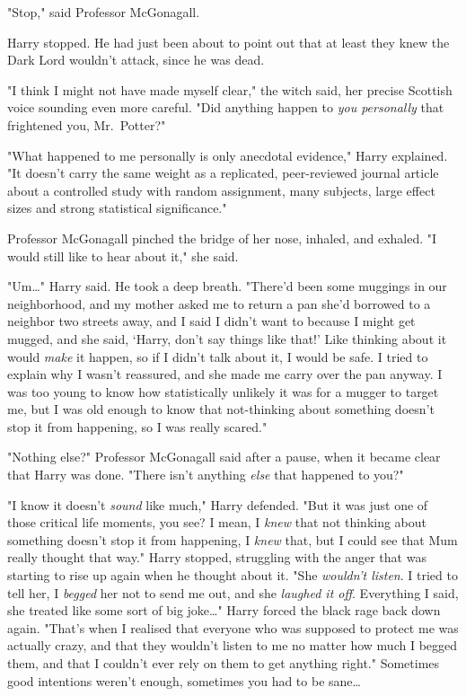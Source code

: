 "Stop," said Professor McGonagall.

Harry stopped. He had just been about to point out that at least they knew the 
Dark Lord wouldn't attack, since he was dead.

"I think I might not have made myself clear," the witch said, her precise 
Scottish voice sounding even more careful. "Did anything happen to \emph{you 
personally} that frightened you, Mr.~Potter?"

"What happened to me personally is only anecdotal evidence," Harry explained. 
"It doesn't carry the same weight as a replicated, peer-reviewed journal 
article about a controlled study with random assignment, many subjects, large 
effect sizes and strong statistical significance."

Professor McGonagall pinched the bridge of her nose, inhaled, and exhaled. "I 
would still like to hear about it," she said.

"Um{\ldots}" Harry said. He took a deep breath. "There'd been some muggings in 
our neighborhood, and my mother asked me to return a pan she'd borrowed to a 
neighbor two streets away, and I said I didn't want to because I might get 
mugged, and she said, `Harry, don't say things like that!' Like thinking about 
it would \emph{make} it happen, so if I didn't talk about it, I would be safe. 
I tried to explain why I wasn't reassured, and she made me carry over the pan 
anyway. I was too young to know how statistically unlikely it was for a mugger 
to target me, but I was old enough to know that not-thinking about something 
doesn't stop it from happening, so I was really scared."

"Nothing else?" Professor McGonagall said after a pause, when it became clear 
that Harry was done. "There isn't anything \emph{else} that happened to you?"

"I know it doesn't \emph{sound} like much," Harry defended. "But it was just 
one of those critical life moments, you see? I mean, I \emph{knew} that not 
thinking about something doesn't stop it from happening, I \emph{knew} that, 
but I could see that Mum really thought that way." Harry stopped, struggling 
with the anger that was starting to rise up again when he thought about it. 
"She \emph{wouldn't listen}. I tried to tell her, I \emph{begged} her not to 
send me out, and she \emph{laughed it off}. Everything I said, she treated like 
some sort of big joke{\ldots}" Harry forced the black rage back down again. 
"That's when I realised that everyone who was supposed to protect me was 
actually crazy, and that they wouldn't listen to me no matter how much I begged 
them, and that I couldn't ever rely on them to get anything right." Sometimes 
good intentions weren't enough, sometimes you had to be sane{\ldots}

